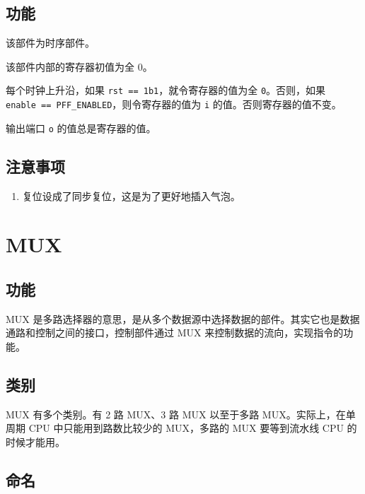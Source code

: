 \documentclass[12pt,AutoFakeBold,AutoFakeSlant]{article}
\providecommand{\tightlist}{%
  \setlength{\itemsep}{0pt}\setlength{\parskip}{0pt}}
\begin{document}
\hypertarget{ux529fux80fd-13}{%
\subsection{功能}\label{ux529fux80fd-13}}

该部件为时序部件。

该部件内部的寄存器初值为全 0。

每个时钟上升沿，如果
\texttt{rst\ ==\ 1\textquotesingle{}b1}，就令寄存器的值为全
\texttt{0}。否则，如果
\texttt{enable\ ==\ PFF\_ENABLED}，则令寄存器的值为 \texttt{i}
的值。否则寄存器的值不变。

输出端口 \texttt{o} 的值总是寄存器的值。

\hypertarget{ux6ce8ux610fux4e8bux9879-9}{%
\subsection{注意事项}\label{ux6ce8ux610fux4e8bux9879-9}}

\begin{enumerate}
\def\labelenumi{\arabic{enumi}.}
\tightlist
\item
  复位设成了同步复位，这是为了更好地插入气泡。
\end{enumerate}

\hypertarget{mux}{%
\section{MUX}\label{mux}}

\hypertarget{ux529fux80fd-14}{%
\subsection{功能}\label{ux529fux80fd-14}}

MUX
是多路选择器的意思，是从多个数据源中选择数据的部件。其实它也是数据通路和控制之间的接口，控制部件通过
MUX 来控制数据的流向，实现指令的功能。

\hypertarget{ux7c7bux522b}{%
\subsection{类别}\label{ux7c7bux522b}}

MUX 有多个类别。有 2 路 MUX、3 路 MUX 以至于多路 MUX。实际上，在单周期
CPU 中只能用到路数比较少的 MUX，多路的 MUX 要等到流水线 CPU
的时候才能用。

\hypertarget{ux547dux540d}{%
\subsection{命名}\label{ux547dux540d}}
\end{document}
